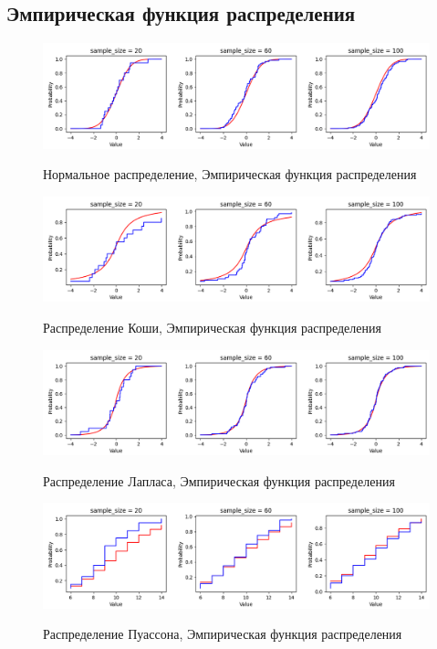 \subsection{Эмпирическая функция распределения}
\label{subsec:result_edf}
\begin{figure}[H]
	\centering
	{\includegraphics[scale=0.6]{part_edf/figures/normal}}
		\caption{Нормальное распределение, Эмпирическая функция распределения}
		\label{fig:edf_normal}
\end{figure}

\begin{figure}[H]
	\centering
	{\includegraphics[scale=0.6]{part_edf/figures/cauchy}}
		\caption{Распределение Коши, Эмпирическая функция распределения}
		\label{fig:edf_cauchy}
	\end{figure}

\begin{figure}[H]
	\centering
	{\includegraphics[scale=0.6]{part_edf/figures/laplace}}
		\caption{Распределение Лапласа, Эмпирическая функция распределения}
		\label{fig:edf_laplace}
	\end{figure}

\begin{figure}[H]
	\centering
	{\includegraphics[scale=0.6]{part_edf/figures/poisson}}
		\caption{Распределение Пуассона, Эмпирическая функция распределения}
		\label{fig:edf_poisson}
	\end{figure}
	
